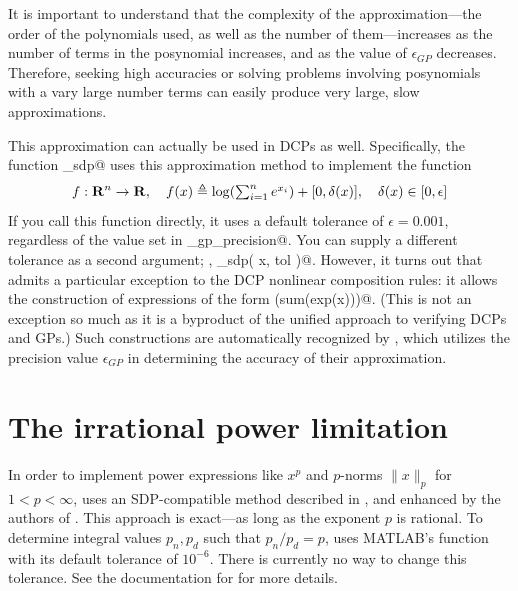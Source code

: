 \documentclass[12pt]{article}
\begin{document}
It is important to understand that the complexity of the approximation---the order of
the polynomials used, as well as the number of them---increases as the
number of terms in the posynomial increases, and as the value of $\epsilon_{GP}$
decreases. Therefore, seeking high accuracies or solving problems involving 
posynomials with a vary large number terms can easily produce very large, slow
approximations.

This approximation can actually be used in DCPs as well.
Specifically, the function \verb@logsumexp_sdp@ uses this approximation
method to implement the function
\begin{equation}
	f:\Rn\rightarrow\R, \quad f(x) \eqbydef \log(\TS\sum_{i=1}^n e^{x_i}) + [0,\delta(x)], \quad \delta(x)\in[0,\epsilon]
\end{equation}
If you call this function directly, it uses a default tolerance of $\epsilon=0.001$, regardless
of the value set in \verb@cvx_gp_precision@. You can supply a different tolerance as a second
argument; \ie, \verb@logsumexp_sdp( x, tol )@. However, it turns out that \cvx admits a 
particular exception to the DCP nonlinear composition rules: it allows the construction
of expressions of the form \verb@log(sum(exp(x)))@. (This is not an exception so much
as it is a byproduct of the unified approach to verifying DCPs and GPs.) 
Such constructions are automatically recognized by \cvx, which utilizes the
precision value $\epsilon_{GP}$ in determining the accuracy of their approximation.

\section{The irrational power limitation}
\label{sec:ratpow}

In order to implement power expressions like $x^p$ and $p$-norms 
$\|x\|_p$ for $1<p<\infty$, \cvx uses an SDP-compatible method
described in \cite{Alizadeh}, and enhanced by the authors of \cvx.
This approach is exact---as long as the
exponent $p$ is rational. To determine integral values $p_n,p_d$ such
that $p_n/p_d=p$, \cvx
uses MATLAB's \verb@rat@ function with its default tolerance
of $10^{-6}$. There is currently no way to change this tolerance.
See the documentation for \verb@rat@  for more details.
\end{document}

